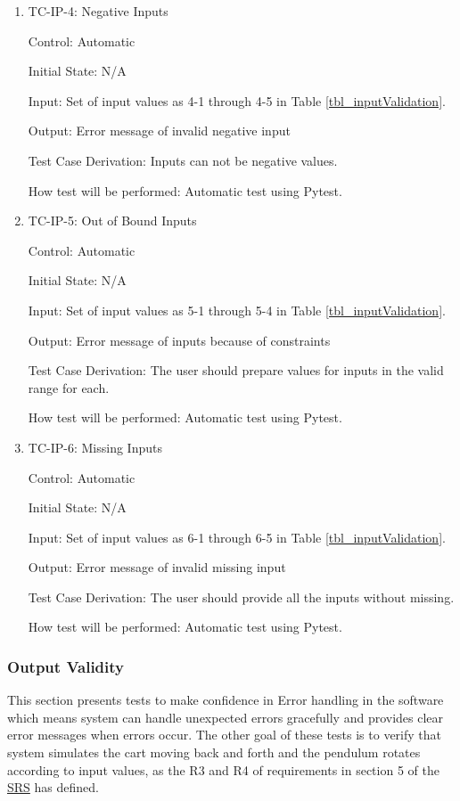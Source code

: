 \documentclass[12pt, titlepage]{article}
\begin{document}
\begin{enumerate}
\item{TC-IP-4: Negative Inputs}

Control: Automatic
					
Initial State: N/A 
					
Input: Set of input values as 4-1 through 4-5 in Table \ref{tbl_inputValidation}.
					
Output: Error message of invalid negative input 

Test Case Derivation: Inputs can not be negative values.
					
How test will be performed: Automatic test using Pytest.

\item{TC-IP-5: Out of Bound Inputs}

Control: Automatic
					
Initial State: N/A 
					
Input: Set of input values as 5-1 through 5-4 in Table \ref{tbl_inputValidation}.
					
Output: Error message of inputs because of constraints

Test Case Derivation: The user should prepare values for inputs in the valid range for each.

How test will be performed: Automatic test using Pytest.

\item{TC-IP-6: Missing Inputs}

Control: Automatic
					
Initial State: N/A 
					
Input: Set of input values as 6-1 through 6-5 in Table \ref{tbl_inputValidation}.
					
Output: Error message of invalid missing input

Test Case Derivation: The user should provide all the inputs without missing.
					
					
How test will be performed: Automatic test using Pytest.			
				
\end{enumerate}

\subsubsection{Output Validity \label{out_val}}

This section presents tests to make confidence in Error handling in the software which means system can handle unexpected errors gracefully and provides clear error messages when errors occur.
The other goal of these tests is to verify that system simulates the cart moving back and forth and the pendulum rotates according to input values, as the R3 and R4 of requirements in section 5 of the  \href{https://github.com/MinMah23/CAS741-Project/tree/main/docs/SRS/SRS.pdf}{SRS} has defined.
\end{document}
